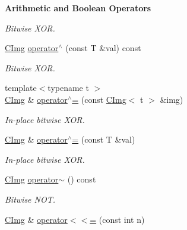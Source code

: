 \begin{Indent}{\bf Arithmetic and Boolean Operators}
\begin{DoxyCompactItemize}
\begin{DoxyCompactList}\small\item\em Bitwise X\-O\-R. \end{DoxyCompactList}\item 
\hypertarget{structcimg__library_1_1_c_img_a454879b224b0eee2e9f1ca2109fa2198}{\hyperlink{structcimg__library_1_1_c_img}{C\-Img} \hyperlink{structcimg__library_1_1_c_img_a454879b224b0eee2e9f1ca2109fa2198}{operator$^\wedge$} (const T \&val) const }\label{structcimg__library_1_1_c_img_a454879b224b0eee2e9f1ca2109fa2198}

\begin{DoxyCompactList}\small\item\em Bitwise X\-O\-R. \end{DoxyCompactList}\item 
\hypertarget{structcimg__library_1_1_c_img_a13e81c790dc94fe1a1dd3dc5cd16d945}{{\footnotesize template$<$typename t $>$ }\\\hyperlink{structcimg__library_1_1_c_img}{C\-Img} \& \hyperlink{structcimg__library_1_1_c_img_a13e81c790dc94fe1a1dd3dc5cd16d945}{operator$^\wedge$=} (const \hyperlink{structcimg__library_1_1_c_img}{C\-Img}$<$ t $>$ \&img)}\label{structcimg__library_1_1_c_img_a13e81c790dc94fe1a1dd3dc5cd16d945}

\begin{DoxyCompactList}\small\item\em In-\/place bitwise X\-O\-R. \end{DoxyCompactList}\item 
\hypertarget{structcimg__library_1_1_c_img_a76474dd94d34621417cf7fae5acc3d28}{\hyperlink{structcimg__library_1_1_c_img}{C\-Img} \& \hyperlink{structcimg__library_1_1_c_img_a76474dd94d34621417cf7fae5acc3d28}{operator$^\wedge$=} (const T \&val)}\label{structcimg__library_1_1_c_img_a76474dd94d34621417cf7fae5acc3d28}

\begin{DoxyCompactList}\small\item\em In-\/place bitwise X\-O\-R. \end{DoxyCompactList}\item 
\hypertarget{structcimg__library_1_1_c_img_af4801dff82c4ebdb6bed81846f8536c7}{\hyperlink{structcimg__library_1_1_c_img}{C\-Img} \hyperlink{structcimg__library_1_1_c_img_af4801dff82c4ebdb6bed81846f8536c7}{operator$\sim$} () const }\label{structcimg__library_1_1_c_img_af4801dff82c4ebdb6bed81846f8536c7}

\begin{DoxyCompactList}\small\item\em Bitwise N\-O\-T. \end{DoxyCompactList}\item 
\hypertarget{structcimg__library_1_1_c_img_a08571e87555ec1f3a2983b3cb6021293}{\hyperlink{structcimg__library_1_1_c_img}{C\-Img} \& \hyperlink{structcimg__library_1_1_c_img_a08571e87555ec1f3a2983b3cb6021293}{operator$<$$<$=} (const int n)}\label{structcimg__library_1_1_c_img_a08571e87555ec1f3a2983b3cb6021293}


\end{DoxyCompactItemize}
\end{Indent}
